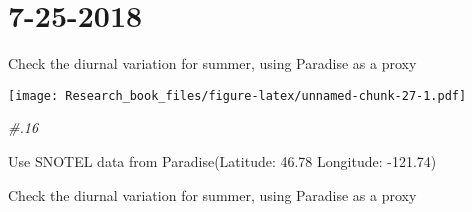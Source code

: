 \documentclass[]{book}
\newenvironment{Shaded}{\begin{snugshade}}{\end{snugshade}}
\newcommand{\KeywordTok}[1]{\textcolor[rgb]{0.13,0.29,0.53}{\textbf{#1}}}
\newcommand{\DecValTok}[1]{\textcolor[rgb]{0.00,0.00,0.81}{#1}}
\newcommand{\StringTok}[1]{\textcolor[rgb]{0.31,0.60,0.02}{#1}}
\newcommand{\CommentTok}[1]{\textcolor[rgb]{0.56,0.35,0.01}{\textit{#1}}}
\newcommand{\OperatorTok}[1]{\textcolor[rgb]{0.81,0.36,0.00}{\textbf{#1}}}
\newcommand{\NormalTok}[1]{#1}
\theoremstyle{definition}
\theoremstyle{definition}
\theoremstyle{definition}
\theoremstyle{remark}
\begin{document}
\section{7-25-2018}\label{section-6}

Check the diurnal variation for summer, using Paradise as a proxy

\begin{Shaded}
\end{Shaded}

\texttt{[image: Research\_book\_files/figure-latex/unnamed-chunk-27-1.pdf]}

\begin{Shaded}
\begin{Highlighting}[]
\CommentTok{#.16}
\end{Highlighting}
\end{Shaded}

Use SNOTEL data from Paradise(Latitude: 46.78 Longitude: -121.74)

Check the diurnal variation for summer, using Paradise as a proxy
\end{document}

